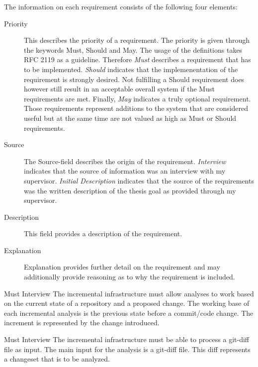 \documentclass[a4paper]{article}
\begin{document}
The information on each requirement consists of the following four elements:

\begin{description}
    \item [Priority]
	This describes the priority of a requirement. The priority is given through the keywords Must, Should and May. The usage of the definitions takes RFC 2119 \cite{RFC-bum} as a guideline. Therefore \emph{Must} describes a requirement that has to be implemented. \emph{Should} indicates that the implemenentation of the requirement is strongly desired. Not fulfilling a Should requirement  does however still result in an acceptable overall system if the Must requirements are met. Finally, \emph{May} indicates a truly optional requirement. Those requirements represent additions to the system that are considered useful but at the same time are not valued as high as Must or Should requirements.
    \item [Source]
    The Source-field describes the origin of the requirement. \emph{Interview} indicates that the source of information was an interview with my supervisor. \emph{Initial Description} indicates that the source of the requirements was the written description of the thesis goal as provided through my supervisor. 
    \item [Description]
    This field provides a description of the requirement.
    \item [Explanation]
    Explanation provides further detail on the requirement and may additionally provide reasoning as to why the requirement is included.
\end{description}
\vspace{2em}


\begin{req} \label{req:working-base}
	\reqtable
	{Must}  {Interview}
	{The incremental infrastructure must allow analyses to work based on the current state of a repository and a proposed change.}
	{The working base of each incremental analysis is the previous state before a commit/code change. The increment is represented by the change introduced.}
	\vspace{1em}

	\begin{subreq} \label{req:git-diff}
		\reqtable
		{Must}  {Interview}
		{The incremental infrastructure must be able to process a git-diff file as input.}
		{The main input for the analysis is a git-diff file. This diff represents a changeset that is to be analyzed.}
	\end{subreq}
\end{req}
\vspace{1em}
\end{document}

